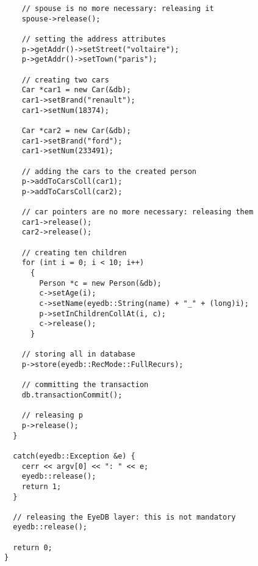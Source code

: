\begin{verbatim}
    // spouse is no more necessary: releasing it
    spouse->release();

    // setting the address attributes
    p->getAddr()->setStreet("voltaire");
    p->getAddr()->setTown("paris");

    // creating two cars
    Car *car1 = new Car(&db);
    car1->setBrand("renault");
    car1->setNum(18374);

    Car *car2 = new Car(&db);
    car1->setBrand("ford");
    car1->setNum(233491);

    // adding the cars to the created person
    p->addToCarsColl(car1);
    p->addToCarsColl(car2);

    // car pointers are no more necessary: releasing them
    car1->release();
    car2->release();

    // creating ten children
    for (int i = 0; i < 10; i++)
      {
        Person *c = new Person(&db);
        c->setAge(i);
        c->setName(eyedb::String(name) + "_" + (long)i);
        p->setInChildrenCollAt(i, c);
        c->release();
      }

    // storing all in database
    p->store(eyedb::RecMode::FullRecurs);

    // committing the transaction
    db.transactionCommit();

    // releasing p
    p->release();
  }

  catch(eyedb::Exception &e) {
    cerr << argv[0] << ": " << e;
    eyedb::release();
    return 1;
  }

  // releasing the EyeDB layer: this is not mandatory
  eyedb::release();

  return 0;
}
\end{verbatim}
\normalsize

